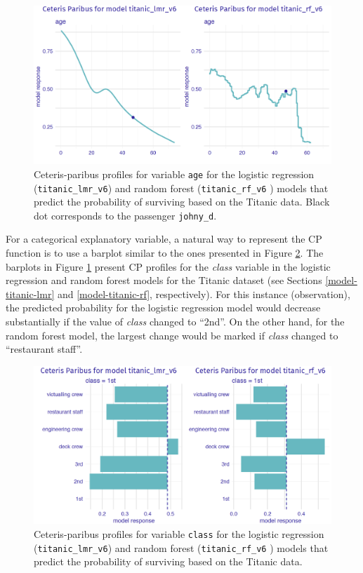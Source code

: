 \documentclass[]{krantz}
\begin{document}
\begin{figure}

{\centering \includegraphics[width=0.7\linewidth]{figure/profile_age_rf} 

}

\caption{Ceteris-paribus profiles for variable \texttt{age} for the logistic regression (\texttt{titanic\_lmr\_v6}) and random forest (\texttt{titanic\_rf\_v6} ) models that predict the probability of surviving based on the Titanic data. Black dot corresponds to the passenger \texttt{johny\_d}.}\label{fig:profileAgeRf}
\end{figure}

For a categorical explanatory variable, a natural way to represent the CP function is to use a barplot similar to the ones presented in Figure \ref{fig:profileAgeRf2}. The barplots in Figure \ref{fig:profileAgeRf} present CP profiles for the \emph{class} variable in the logistic regression and random forest models for the Titanic dataset (see Sections \ref{model-titanic-lmr} and \ref{model-titanic-rf}, respectively). For this instance (observation), the predicted probability for the logistic regression model would decrease substantially if the value of \emph{class} changed to ``2nd''. On the other hand, for the random forest model, the largest change would be marked if \emph{class} changed to ``restaurant staff''.



\begin{figure}

{\centering \includegraphics[width=0.7\linewidth]{figure/profile_class_rf} 

}

\caption{Ceteris-paribus profiles for variable \texttt{class} for the logistic regression (\texttt{titanic\_lmr\_v6}) and random forest (\texttt{titanic\_rf\_v6} ) models that predict the probability of surviving based on the Titanic data.}\label{fig:profileAgeRf2}
\end{figure}
\end{document}
